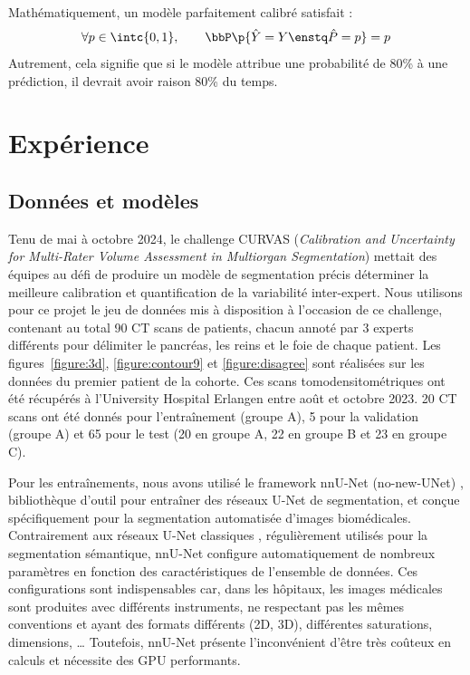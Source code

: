 \documentclass[a4paper,french,bookmarks,12pt]{article}
\begin{document}
    Mathématiquement, un modèle parfaitement calibré satisfait :
    \[ \forall p \in \intc{0, 1},\qquad \bbP\p{\hat{Y} = Y \enstq \hat{P} = p} = p \]
    Autrement, cela signifie que si le modèle attribue une probabilité de 80\% à une prédiction, il devrait avoir raison 80\% du temps.

    \section{Expérience}

    \subsection{Données et modèles}

    Tenu de mai à octobre 2024, le challenge \textsc{CURVAS} (\emph{Calibration and Uncertainty for Multi-Rater Volume Assessment in Multiorgan Segmentation}) mettait des équipes au défi de produire un modèle de segmentation précis déterminer la meilleure calibration et quantification de la variabilité inter-expert. Nous utilisons pour ce projet le jeu de données mis à disposition à l'occasion de ce challenge, contenant au total 90 CT scans de patients, chacun annoté par 3 experts différents pour délimiter le pancréas, les reins et le foie de chaque patient. Les figures~\ref{figure:3d}, \ref{figure:contour9} et \ref{figure:disagree} sont réalisées sur les données du premier patient de la cohorte. Ces scans tomodensitométriques ont été récupérés à l'University Hospital Erlangen entre août et octobre 2023. 20 CT scans ont été donnés pour l'entraînement (groupe A), 5 pour la validation (groupe A) et 65 pour le test (20 en groupe A, 22 en groupe B et 23 en groupe C).

    Pour les entraînements, nous avons utilisé le framework nnU-Net (no-new-UNet) \parencite{nnunet}, bibliothèque d'outil pour entraîner des réseaux U-Net de segmentation, et conçue spécifiquement pour la segmentation automatisée d'images biomédicales. Contrairement aux réseaux U-Net classiques \parencite{unet}, régulièrement utilisés pour la segmentation sémantique, nnU-Net configure automatiquement de nombreux paramètres en fonction des caractéristiques de l'ensemble de données. Ces configurations sont indispensables car, dans les hôpitaux, les images médicales sont produites avec différents instruments, ne respectant pas les mêmes conventions et ayant des formats différents (2D, 3D), différentes saturations, dimensions, \dots{} Toutefois, nnU-Net présente l'inconvénient d'être très coûteux en calculs et nécessite des GPU performants.
\end{document}
